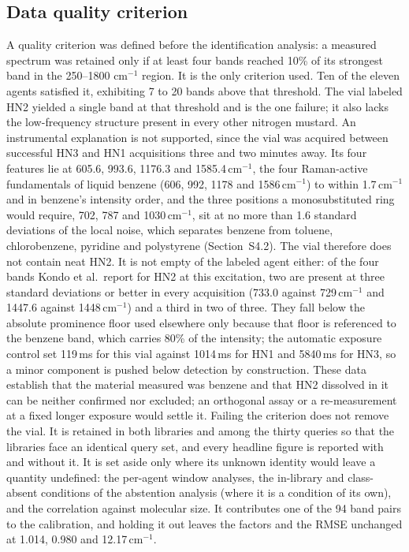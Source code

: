 \documentclass[review,12pt]{elsarticle}
\newcommand*\wn{\ensuremath{\text{cm}^{-1}}}
\begin{document}
\subsection{Data quality criterion}

A quality criterion was defined before the identification analysis: a measured spectrum was retained only if at least four bands reached 10\% of its strongest band in the 250--1800 \wn{} region. It is the only criterion used. Ten of the eleven agents satisfied it, exhibiting 7 to 20 bands above that threshold. The vial labeled HN2 yielded a single band at that threshold and is the one failure; it also lacks the low-frequency structure present in every other nitrogen mustard. An instrumental explanation is not supported, since the vial was acquired between successful HN3 and HN1 acquisitions three and two minutes away. Its four features lie at 605.6, 993.6, 1176.3 and 1585.4\,\wn{}, the four Raman-active fundamentals of liquid benzene (606, 992, 1178 and 1586\,\wn{}) to within 1.7\,\wn{} and in benzene's intensity order, and the three positions a monosubstituted ring would require, 702, 787 and 1030\,\wn{}, sit at no more than 1.6 standard deviations of the local noise, which separates benzene from toluene, chlorobenzene, pyridine and polystyrene (Section~S4.2). The vial therefore does not contain neat HN2. It is not empty of the labeled agent either: of the four bands Kondo et al.\ report for HN2 at this excitation, two are present at three standard deviations or better in every acquisition (733.0 against 729\,\wn{} and 1447.6 against 1448\,\wn{}) and a third in two of three.\cite{kondo2018analysis} They fall below the absolute prominence floor used elsewhere only because that floor is referenced to the benzene band, which carries 80\% of the intensity; the automatic exposure control set 119\,ms for this vial against 1014\,ms for HN1 and 5840\,ms for HN3, so a minor component is pushed below detection by construction. These data establish that the material measured was benzene and that HN2 dissolved in it can be neither confirmed nor excluded; an orthogonal assay or a re-measurement at a fixed longer exposure would settle it. Failing the criterion does not remove the vial. It is retained in both libraries and among the thirty queries so that the libraries face an identical query set, and every headline figure is reported with and without it. It is set aside only where its unknown identity would leave a quantity undefined: the per-agent window analyses, the in-library and class-absent conditions of the abstention analysis (where it is a condition of its own), and the correlation against molecular size. It contributes one of the 94 band pairs to the calibration, and holding it out leaves the factors and the RMSE unchanged at 1.014, 0.980 and 12.17\,\wn{}.
\end{document}

